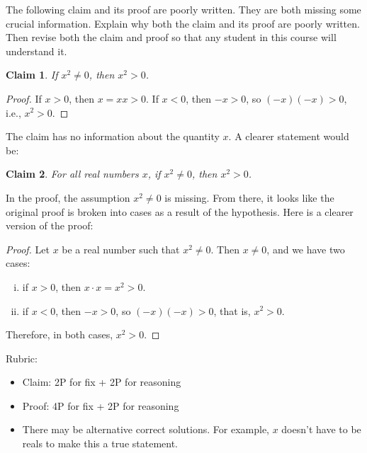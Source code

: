 \documentclass{article}
\newtheorem*{claim}{Claim}
\theoremstyle{definition}
\begin{document}
\begin{question}{10}
   The following claim and its proof are poorly written. They are both missing some crucial information. 
   Explain why both the claim and its proof are poorly written. Then revise both the claim and proof so that any student in this course will understand it. 
      \begin{claim}
       If $x^2\neq 0$, then $x^2>0$.
      \end{claim}
      \begin{proof}
       If $x>0$, then $x=xx>0$. If $x<0$, then $-x>0$, so $(-x)(-x)>0$, i.e., $x^2>0$.
      \end{proof}
\end{question}
\begin{solution}
    The claim has no information about the quantity $x$. A clearer statement would be:
        \begin{claim}
           For all real numbers $x$, if $x^2\neq 0$, then $x^2>0$.
        \end{claim}
    In the proof, the assumption $x^2\neq 0$ is missing. 
    From there, it looks like the original proof is broken into cases as a result of the hypothesis. 
    Here is a clearer version of the proof:
        \begin{proof}
           Let $x$ be a real number such that $x^2\neq 0$. Then $x\neq 0$, and we have two cases:
            \begin{enumerate}[i.]
                 \item if $x>0$, then $x\cdot x=x^2>0$.
                 \item if $x<0$, then $-x>0$, so $(-x)(-x)>0$, that is, $x^2>0$.
            \end{enumerate}
           Therefore, in both cases, $x^2>0$.
        \end{proof}

{\color{red} Rubric:
\begin{itemize}
\item Claim: 2P for fix + 2P for reasoning
\item Proof: 4P for fix + 2P for reasoning
\item There may be alternative correct solutions. For example, $x$ doesn't have to be reals to make this a true statement.
\end{itemize}}
\end{solution}
\end{document}
